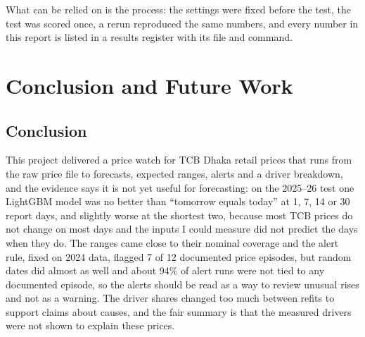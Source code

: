 \documentclass[12pt]{report}
\begin{document}
What can be relied on is the process: the settings were fixed before the test, the test was scored once, a rerun reproduced the same numbers, and every number in this report is listed in a results register with its file and command.

\chapter{Conclusion and Future Work}

\section{Conclusion}
This project delivered a price watch for TCB Dhaka retail prices that runs from the raw price file to forecasts, expected ranges, alerts and a driver breakdown, and the evidence says it is not yet useful for forecasting: on the 2025--26 test one LightGBM model was no better than ``tomorrow equals today'' at 1, 7, 14 or 30 report days, and slightly worse at the shortest two, because most TCB prices do not change on most days and the inputs I could measure did not predict the days when they do. The ranges came close to their nominal coverage and the alert rule, fixed on 2024 data, flagged 7 of 12 documented price episodes, but random dates did almost as well and about 94\% of alert runs were not tied to any documented episode, so the alerts should be read as a way to review unusual rises and not as a warning. The driver shares changed too much between refits to support claims about causes, and the fair summary is that the measured drivers were not shown to explain these prices.
\end{document}
